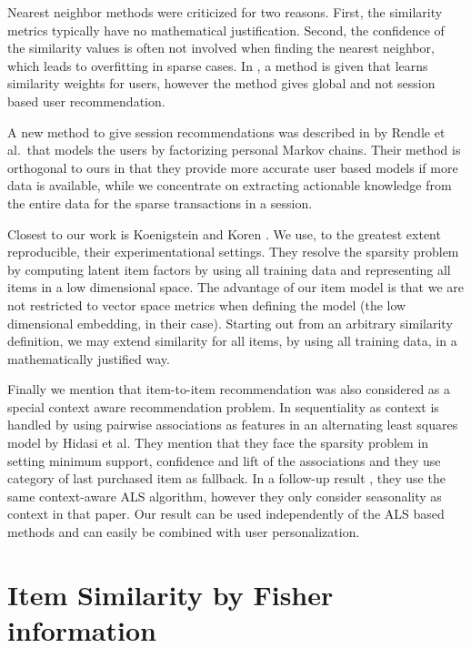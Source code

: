 \documentclass[preprint]{sig-alternate-05-2015}
\begin{document}
Nearest neighbor methods were criticized for two reasons.  First, the similarity metrics typically have no mathematical justification. Second, the confidence of the similarity values is often not involved when finding the nearest neighbor, which leads to overfitting in sparse cases. 
In \cite{koren2010factor}, a method is given that learns similarity weights for users, however the method gives global and not session based user recommendation.

A new method to give session recommendations was described in \cite{rendle2010factorizing} by Rendle et al.\ that models the users by factorizing personal Markov chains.
Their method is orthogonal to ours in that they provide more accurate user based models if more data is available, while we concentrate on extracting actionable knowledge from the entire data for the sparse transactions in a session.

Closest to our work is Koenigstein and Koren \cite{koenigstein2013towards}.
We use, to the greatest extent reproducible, their experimentational settings.
They resolve the sparsity problem by computing latent item factors by using all training data and representing all items in a low dimensional space.
The advantage of our item model is that we are not restricted to vector space metrics when defining the model (the low dimensional embedding, in their case).
Starting out from an arbitrary similarity definition, we may extend similarity for all items, by using all training data, in a mathematically justified way.

Finally we mention that item-to-item recommendation was also considered as a special context aware recommendation problem.
In \cite{hidasi2012fast} sequentiality as context is handled by using pairwise associations as features in an alternating least squares model by Hidasi et al.
They mention that they face the sparsity problem in setting minimum support, confidence and lift of the associations and they use category of last purchased item as fallback.
In a follow-up result \cite{hidasi2013context}, they use the same context-aware ALS algorithm, however they only consider seasonality as context in that paper.
Our result can be used independently of the ALS based methods and can easily be combined with user personalization.

\section{Item Similarity by Fisher information}
\end{document}
